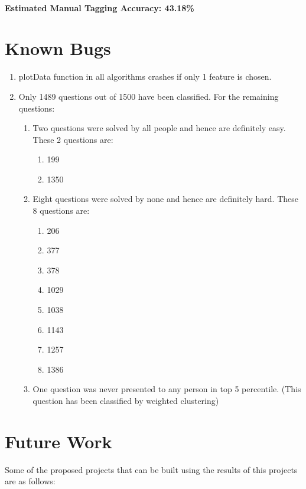 \documentclass[12pt]{article}
\begin{document}
	\paragraph{Estimated Manual Tagging Accuracy: 43.18\%}
	
	
	\newpage
	\section{Known Bugs}
	\begin{enumerate}
		\item plotData function in all algorithms crashes if only 1 feature is chosen.
		\item Only 1489 questions out of 1500 have been classified. For the remaining questions:
		\begin{enumerate}
			\item Two questions were solved by all people and hence are definitely easy.
			These 2 questions are:
			\begin{enumerate}
				\item 199
				\item 1350
			\end{enumerate}
			\item Eight questions were solved by none and hence are definitely hard.
			These 8 questions are:
			\begin{enumerate}
				\item 206
				\item 377
				\item 378
				\item 1029
				\item 1038
				\item 1143
				\item 1257
				\item 1386
			\end{enumerate}
			\item One question was never presented to any person in top 5 percentile.
			(This question has been classified by weighted clustering) 
		\end{enumerate}
	\end{enumerate}
	
	
	\section{Future Work}
	Some of the proposed projects that can be built using the results of
	this projects are as follows:
	
\end{document}
